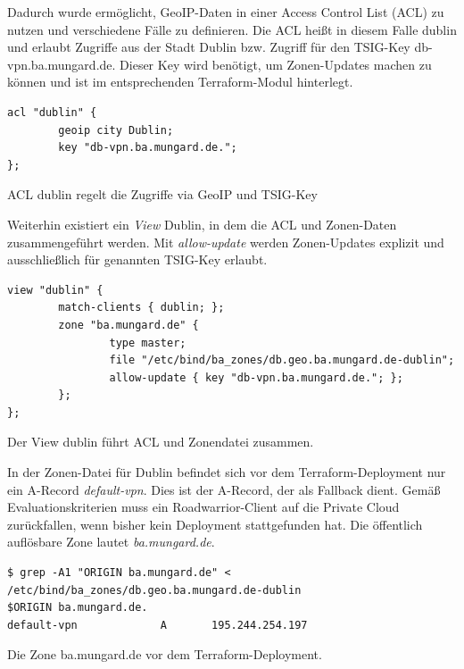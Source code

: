 Dadurch wurde ermöglicht, GeoIP-Daten in einer Access Control List (ACL) zu nutzen und verschiedene Fälle zu definieren. Die ACL heißt in diesem Falle \glqq dublin\grqq{} und erlaubt Zugriffe aus der Stadt Dublin bzw. Zugriff für den TSIG-Key \glqq db-vpn.ba.mungard.de\grqq{}. Dieser Key wird benötigt, um Zonen-Updates machen zu können und ist im entsprechenden Terraform-Modul hinterlegt.
\begin{listing}[h]
\begin{verbatim}
acl "dublin" {
        geoip city Dublin;
        key "db-vpn.ba.mungard.de.";
};
\end{verbatim}
\caption{ACL \glqq dublin\grqq{} regelt die Zugriffe via GeoIP und TSIG-Key}
\label{tsig-key-acl}
\end{listing}\FloatBarrier
Weiterhin existiert ein \textit{View} \glqq Dublin\grqq{}, in dem die ACL und Zonen-Daten zusammengeführt werden. Mit \textit{allow-update} werden Zonen-Updates explizit und ausschließlich für genannten TSIG-Key erlaubt.
\begin{listing}[h]
\begin{verbatim}
view "dublin" {
        match-clients { dublin; };
        zone "ba.mungard.de" {
                type master;
                file "/etc/bind/ba_zones/db.geo.ba.mungard.de-dublin";
                allow-update { key "db-vpn.ba.mungard.de."; };
        };
};
\end{verbatim}
\caption{Der View \glqq dublin\grqq{} führt ACL und Zonendatei zusammen.}
\label{view-dublin-bind}
\end{listing}\FloatBarrier
In der Zonen-Datei für Dublin befindet sich vor dem Terraform-Deployment nur ein A-Record \textit{default-vpn}. Dies ist der A-Record, der als Fallback dient. Gemäß Evaluationskriterien muss ein Roadwarrior-Client auf die Private Cloud zurückfallen, wenn bisher kein Deployment stattgefunden hat. Die öffentlich auflösbare Zone lautet \textit{ba.mungard.de}.
\begin{listing}[h]
\begin{verbatim}
$ grep -A1 "ORIGIN ba.mungard.de" < /etc/bind/ba_zones/db.geo.ba.mungard.de-dublin
$ORIGIN ba.mungard.de.
default-vpn             A       195.244.254.197
\end{verbatim}
\caption{Die Zone ba.mungard.de vor dem Terraform-Deployment.}
\label{zone-dublin-before-deployment}
\end{listing}\FloatBarrier
